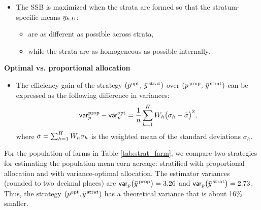 \documentclass{my_eth_beamer}
\numberwithin{equation}{section}
\begin{document}
\begin{frame}
    \begin{itemize}
    \setlength{\itemsep}{8pt}
        \item The \alert{SSB} is \alert{maximized} when the strata are formed
            so that the stratum-specific \alert{means} $\bar{y}_{h,U}$:
        \vspace{0.25em}
        \begin{itemize}
        \setlength{\itemsep}{6pt}
            \item are as \alert{different} as possible across strata,
            \item while the strata are as \alert{homogeneous} as possible
                internally.
        \end{itemize}
    \end{itemize}
    \vspace{0.75em}
    \noindent\textcolor{fhnwblue}{\bfseries Optimal vs. proportional
        allocation}
    \begin{itemize}
    \setlength{\itemsep}{8pt}
        \item The \alert{efficiency gain} of the strategy $(p^{\mathrm{opt}},\,
            \bar{y}^{\,\mathrm{strat}})$ over $(p^{\,\mathrm{prop}},\, \bar{y}^{\,\mathrm{strat}})$
            can be expressed as the following difference in variances:
            \begin{equation*}
                \mathsf{var}_p^{\mathrm{prop}} - \mathsf{var}_p^{\mathrm{opt}} = \frac{1}{n} \sum_{h = 1}^H W_h
                \big(\sigma_h - \bar{\sigma}\big)^2,
            \end{equation*}
        \noindent where $\bar{\sigma} = \sum_{h=1}^H W_h \sigma_h$ is the
            \alert{weighted mean of the standard deviations} $\sigma_h$.
   \end{itemize}
\end{frame}

\begin{frame}
    \begin{Bsp} \label{ex:strat_county_eff}
        \vspace{-0.25em}
        For the population of farms in Table \ref{tab:strat_farm}, we compare
        two strategies for estimating the population mean corn acreage:
        stratified \SRS with proportional allocation and with variance-optimal
        allocation. The estimator variances (rounded to two decimal places)
        are $\mathsf{var}_p\big(\bar{y}^{\,\mathrm{prop}}\big)=3.26$ and
        $\mathsf{var}_p\big(\bar{y}^{\,\mathrm{strat}}\big)=2.73$. Thus, the strategy
        $(p^{\mathrm{opt}}, \bar{y}^{\,\mathrm{strat}})$ has a theoretical variance that is
        about 16\% smaller.
    \end{Bsp}
\end{frame}
\end{document}
